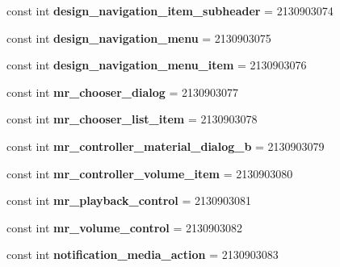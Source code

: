 \begin{DoxyCompactItemize}
const int {\bfseries design\+\_\+navigation\+\_\+item\+\_\+subheader} = 2130903074
\item 
\mbox{\label{classXaria_1_1Resource_1_1Layout_aa5a71f514de4084acb5107089c5cbf1a}} 
const int {\bfseries design\+\_\+navigation\+\_\+menu} = 2130903075
\item 
\mbox{\label{classXaria_1_1Resource_1_1Layout_a65008b6331dc6deeaf67741d0d773c43}} 
const int {\bfseries design\+\_\+navigation\+\_\+menu\+\_\+item} = 2130903076
\item 
\mbox{\label{classXaria_1_1Resource_1_1Layout_a5f5d2c287fb26b929ab63f979abfe0d9}} 
const int {\bfseries mr\+\_\+chooser\+\_\+dialog} = 2130903077
\item 
\mbox{\label{classXaria_1_1Resource_1_1Layout_a49931e4481fd054f657679e753cfd389}} 
const int {\bfseries mr\+\_\+chooser\+\_\+list\+\_\+item} = 2130903078
\item 
\mbox{\label{classXaria_1_1Resource_1_1Layout_a624dbdc185923b66335f2663168cf635}} 
const int {\bfseries mr\+\_\+controller\+\_\+material\+\_\+dialog\+\_\+b} = 2130903079
\item 
\mbox{\label{classXaria_1_1Resource_1_1Layout_a594034b0ca6f7cab75d854ebfbbe68fb}} 
const int {\bfseries mr\+\_\+controller\+\_\+volume\+\_\+item} = 2130903080
\item 
\mbox{\label{classXaria_1_1Resource_1_1Layout_ae484091761066286a8e65337ad63907a}} 
const int {\bfseries mr\+\_\+playback\+\_\+control} = 2130903081
\item 
\mbox{\label{classXaria_1_1Resource_1_1Layout_a96677eb8e21c2067e5490f5b38947707}} 
const int {\bfseries mr\+\_\+volume\+\_\+control} = 2130903082
\item 
\mbox{\label{classXaria_1_1Resource_1_1Layout_a1a3ce7d3c0c11d37d08b8f6955638e81}} 
const int {\bfseries notification\+\_\+media\+\_\+action} = 2130903083

\end{DoxyCompactItemize}
